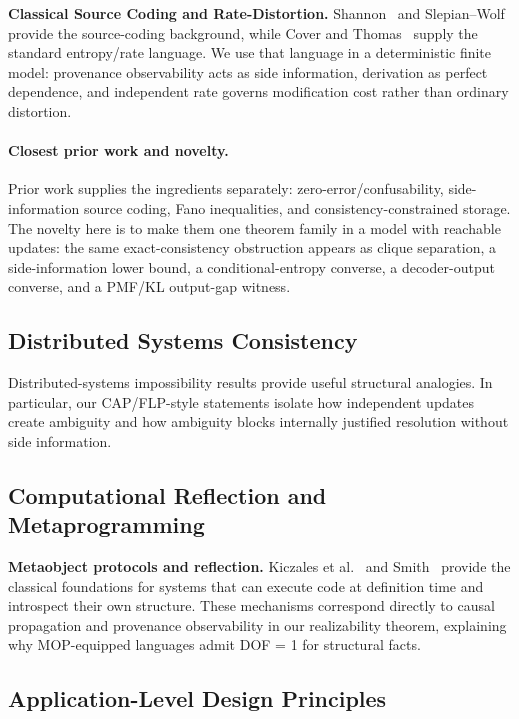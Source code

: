 \textbf{Classical Source Coding and Rate-Distortion.} Shannon~\cite{shannon1948mathematical} and Slepian--Wolf~\cite{slepian1973noiseless} provide the source-coding background, while Cover and Thomas~\cite{cover2006elements} supply the standard entropy/rate language. We use that language in a deterministic finite model: provenance observability acts as side information, derivation as perfect dependence, and independent rate governs modification cost rather than ordinary distortion.

\paragraph{Closest prior work and novelty.}
Prior work supplies the ingredients separately: zero-error/confusability, side-information source coding, Fano inequalities, and consistency-constrained storage. The novelty here is to make them one theorem family in a model with reachable updates: the same exact-consistency obstruction appears as clique separation, a side-information lower bound, a conditional-entropy converse, a decoder-output converse, and a PMF/KL output-gap witness.

\subsection{Distributed Systems Consistency}\label{sec:related-distributed}

Distributed-systems impossibility results provide useful structural analogies. In particular, our CAP/FLP-style statements isolate how independent updates create ambiguity and how ambiguity blocks internally justified resolution without side information.

\subsection{Computational Reflection and Metaprogramming}\label{sec:related-meta}

\textbf{Metaobject protocols and reflection.} Kiczales et al.~\cite{kiczales1991art} and Smith~\cite{smith1984reflection} provide the classical foundations for systems that can execute code at definition time and introspect their own structure. These mechanisms correspond directly to causal propagation and provenance observability in our realizability theorem, explaining why MOP-equipped languages admit DOF = 1 for structural facts.

\subsection{Application-Level Design Principles}\label{sec:related-software}

